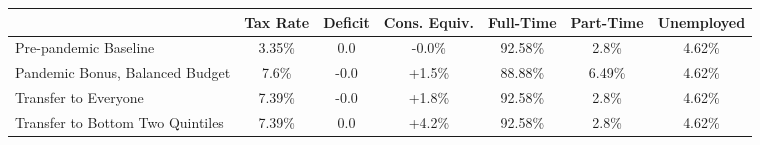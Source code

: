 \begin{center}
\begin{adjustbox}{width=\textwidth}
\begin{tabular}{lcccccc}\toprule
 & Tax Rate & Deficit & Cons. Equiv. & Full-Time & Part-Time & Unemployed \\
\midrule
Pre-pandemic Baseline & 3.35\% & 0.0 & -0.0\% & 92.58\% & 2.8\% & 4.62\% \\
Pandemic Bonus, Balanced Budget & 7.6\% & -0.0 & +1.5\% & 88.88\% & 6.49\% & 4.62\% \\
Transfer to Everyone & 7.39\% & -0.0 & +1.8\% & 92.58\% & 2.8\% & 4.62\% \\
Transfer to Bottom Two Quintiles & 7.39\% & 0.0 & +4.2\% & 92.58\% & 2.8\% & 4.62\% \\
\bottomrule\end{tabular}
\end{adjustbox}
\end{center}